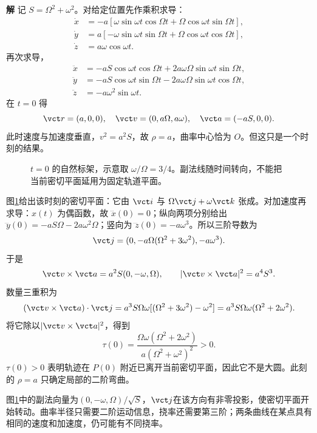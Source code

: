 \documentclass[11pt,openany,fontset=fandol]{ctexbook}
\theoremstyle{definition}\newtheorem{example}{例}[chapter]\newtheorem{exercise}{习题}[chapter]
\newcommand{\SolutionStart}{\par\medskip\ifdim\pagetotal>0pt\ifdim\dimexpr\pagegoal-\pagetotal\relax<3\baselineskip\newpage\fi\fi\noindent\textbf{解}\quad\ignorespaces}
\newenvironment{solution}{\SolutionStart}{\par\medskip}
\begin{document}
\begin{solution}
记 $S=\Omega^2+\omega^2$。对给定位置先作乘积求导：
\[
\begin{aligned}
\dot x&=-a[\omega\sin\omega t\cos\Omega t+\Omega\cos\omega t\sin\Omega t],\\
\dot y&=a[-\omega\sin\omega t\sin\Omega t+\Omega\cos\omega t\cos\Omega t],\\
\dot z&=a\omega\cos\omega t.
\end{aligned}
\]
再次求导，
\[
\begin{aligned}
\ddot x&=-aS\cos\omega t\cos\Omega t+2a\omega\Omega\sin\omega t\sin\Omega t,\\
\ddot y&=-aS\cos\omega t\sin\Omega t-2a\omega\Omega\sin\omega t\cos\Omega t,\\
\ddot z&=-a\omega^2\sin\omega t.
\end{aligned}
\]
在 $t=0$ 得
\[
\vct r=(a,0,0),\quad
\vct v=(0,a\Omega,a\omega),\quad
\vct a=(-aS,0,0).
\]
此时速度与加速度垂直，$v^2=a^2S$，故 $\rho=a$，曲率中心恰为 $O$。但这只是一个时刻的结果。

\begin{figure}[H]\centering
{}
\caption{$t=0$ 的自然标架，示意取 $\omega/\Omega=3/4$。副法线随时间转向，不能把当前密切平面延用为固定轨道平面。}\label{mp3:fig:l3-p9-s}
\end{figure}


图\ref{mp3:fig:l3-p9-s}给出该时刻的密切平面：它由 $\vct i$ 与 $\Omega\vct j+\omega\vct k$ 张成。对加速度再求导：$x(t)$ 为偶函数，故 $\dddot x(0)=0$；纵向两项分别给出 $\dddot y(0)=-aS\Omega-2a\omega^2\Omega$；竖向为 $\dddot z(0)=-a\omega^3$。所以三阶导数为
\[
\vct j=(0,-a\Omega(\Omega^2+3\omega^2),-a\omega^3).
\]
于是
\[
\vct v\times\vct a=a^2S(0,-\omega,\Omega),\qquad
|\vct v\times\vct a|^2=a^4S^3.
\]
数量三重积为
\[
(\vct v\times\vct a)\cdot\vct j
=a^3S\Omega\omega[(\Omega^2+3\omega^2)-\omega^2]
=a^3S\Omega\omega(\Omega^2+2\omega^2).
\]
将它除以$|\vct v\times\vct a|^2$，得到
\[
\tau(0)=
\frac{\Omega\omega(\Omega^2+2\omega^2)}
{a(\Omega^2+\omega^2)^2}>0.
\]
$\tau(0)>0$ 表明轨迹在 $P(0)$ 附近已离开当前密切平面，因此它不是大圆。此刻的 $\rho=a$ 只确定局部的二阶弯曲。

图\ref{mp3:fig:l3-p9-s}中的副法向量为$(0,-\omega,\Omega)/\sqrt S$，$\vct j$在该方向有非零投影，使密切平面开始转动。曲率半径只需要二阶运动信息，挠率还需要第三阶；两条曲线在某点具有相同的速度和加速度，仍可能有不同挠率。
\end{solution}
\end{document}

